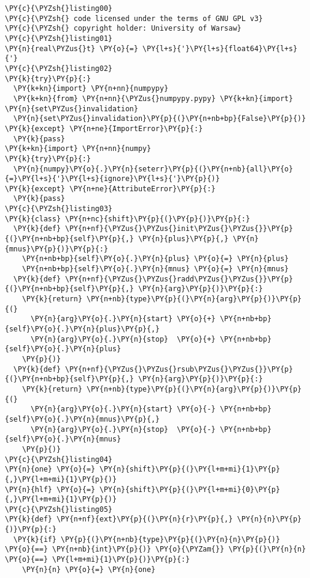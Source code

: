 \begin{Verbatim}[commandchars=\\\{\}]
\PY{c}{\PYZsh{}listing00}
\PY{c}{\PYZsh{} code licensed under the terms of GNU GPL v3}
\PY{c}{\PYZsh{} copyright holder: University of Warsaw}
\PY{c}{\PYZsh{}listing01}
\PY{n}{real\PYZus{}t} \PY{o}{=} \PY{l+s}{'}\PY{l+s}{float64}\PY{l+s}{'}
\PY{c}{\PYZsh{}listing02}
\PY{k}{try}\PY{p}{:}
  \PY{k+kn}{import} \PY{n+nn}{numpypy}
  \PY{k+kn}{from} \PY{n+nn}{\PYZus{}numpypy.pypy} \PY{k+kn}{import} \PY{n}{set\PYZus{}invalidation}
  \PY{n}{set\PYZus{}invalidation}\PY{p}{(}\PY{n+nb+bp}{False}\PY{p}{)}
\PY{k}{except} \PY{n+ne}{ImportError}\PY{p}{:}
  \PY{k}{pass}
\PY{k+kn}{import} \PY{n+nn}{numpy}
\PY{k}{try}\PY{p}{:} 
  \PY{n}{numpy}\PY{o}{.}\PY{n}{seterr}\PY{p}{(}\PY{n+nb}{all}\PY{o}{=}\PY{l+s}{'}\PY{l+s}{ignore}\PY{l+s}{'}\PY{p}{)}
\PY{k}{except} \PY{n+ne}{AttributeError}\PY{p}{:}
  \PY{k}{pass}
\PY{c}{\PYZsh{}listing03}
\PY{k}{class} \PY{n+nc}{shift}\PY{p}{(}\PY{p}{)}\PY{p}{:}
  \PY{k}{def} \PY{n+nf}{\PYZus{}\PYZus{}init\PYZus{}\PYZus{}}\PY{p}{(}\PY{n+nb+bp}{self}\PY{p}{,} \PY{n}{plus}\PY{p}{,} \PY{n}{mnus}\PY{p}{)}\PY{p}{:}
    \PY{n+nb+bp}{self}\PY{o}{.}\PY{n}{plus} \PY{o}{=} \PY{n}{plus}
    \PY{n+nb+bp}{self}\PY{o}{.}\PY{n}{mnus} \PY{o}{=} \PY{n}{mnus}
  \PY{k}{def} \PY{n+nf}{\PYZus{}\PYZus{}radd\PYZus{}\PYZus{}}\PY{p}{(}\PY{n+nb+bp}{self}\PY{p}{,} \PY{n}{arg}\PY{p}{)}\PY{p}{:} 
    \PY{k}{return} \PY{n+nb}{type}\PY{p}{(}\PY{n}{arg}\PY{p}{)}\PY{p}{(}
      \PY{n}{arg}\PY{o}{.}\PY{n}{start} \PY{o}{+} \PY{n+nb+bp}{self}\PY{o}{.}\PY{n}{plus}\PY{p}{,} 
      \PY{n}{arg}\PY{o}{.}\PY{n}{stop}  \PY{o}{+} \PY{n+nb+bp}{self}\PY{o}{.}\PY{n}{plus}
    \PY{p}{)}
  \PY{k}{def} \PY{n+nf}{\PYZus{}\PYZus{}rsub\PYZus{}\PYZus{}}\PY{p}{(}\PY{n+nb+bp}{self}\PY{p}{,} \PY{n}{arg}\PY{p}{)}\PY{p}{:} 
    \PY{k}{return} \PY{n+nb}{type}\PY{p}{(}\PY{n}{arg}\PY{p}{)}\PY{p}{(}
      \PY{n}{arg}\PY{o}{.}\PY{n}{start} \PY{o}{-} \PY{n+nb+bp}{self}\PY{o}{.}\PY{n}{mnus}\PY{p}{,} 
      \PY{n}{arg}\PY{o}{.}\PY{n}{stop}  \PY{o}{-} \PY{n+nb+bp}{self}\PY{o}{.}\PY{n}{mnus}
    \PY{p}{)}
\PY{c}{\PYZsh{}listing04}
\PY{n}{one} \PY{o}{=} \PY{n}{shift}\PY{p}{(}\PY{l+m+mi}{1}\PY{p}{,}\PY{l+m+mi}{1}\PY{p}{)} 
\PY{n}{hlf} \PY{o}{=} \PY{n}{shift}\PY{p}{(}\PY{l+m+mi}{0}\PY{p}{,}\PY{l+m+mi}{1}\PY{p}{)}
\PY{c}{\PYZsh{}listing05}
\PY{k}{def} \PY{n+nf}{ext}\PY{p}{(}\PY{n}{r}\PY{p}{,} \PY{n}{n}\PY{p}{)}\PY{p}{:}
  \PY{k}{if} \PY{p}{(}\PY{n+nb}{type}\PY{p}{(}\PY{n}{n}\PY{p}{)} \PY{o}{==} \PY{n+nb}{int}\PY{p}{)} \PY{o}{\PYZam{}} \PY{p}{(}\PY{n}{n} \PY{o}{==} \PY{l+m+mi}{1}\PY{p}{)}\PY{p}{:} 
    \PY{n}{n} \PY{o}{=} \PY{n}{one}

\end{Verbatim}
